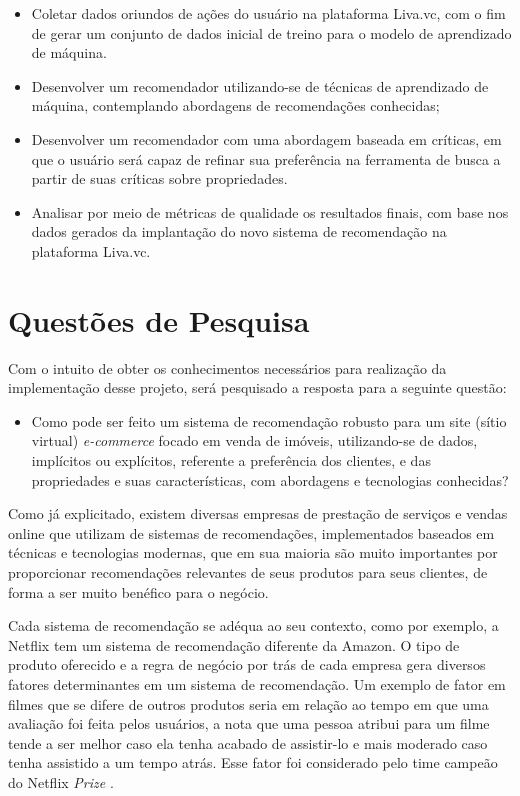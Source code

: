 \begin{itemize}
    \item Coletar dados oriundos de ações do usuário na plataforma Liva.vc, com o fim de gerar um conjunto de dados inicial de treino para o modelo de aprendizado de máquina.
    \item Desenvolver um recomendador utilizando-se de técnicas de aprendizado de máquina, contemplando abordagens de recomendações conhecidas;
    \item Desenvolver um recomendador com uma abordagem baseada em críticas, em que o usuário será capaz de refinar sua preferência na ferramenta de busca a partir de suas críticas sobre propriedades.
    \item Analisar por meio de métricas de qualidade os resultados finais, com base nos dados gerados da implantação do novo sistema de recomendação na plataforma Liva.vc.
\end{itemize}

\section{Questões de Pesquisa}

Com o intuito de obter os conhecimentos necessários para realização da implementação desse projeto, será pesquisado a resposta para a seguinte questão:
\begin{itemize}
    \item Como pode ser feito um sistema de recomendação robusto para um site (sítio virtual) \textit{e-commerce} focado em venda de imóveis, utilizando-se de dados, implícitos ou explícitos, referente a preferência dos clientes, e das propriedades e suas características, com abordagens e tecnologias conhecidas?
\end{itemize}

Como já explicitado, existem diversas empresas de prestação de serviços e vendas online que utilizam de sistemas de recomendações, implementados baseados em técnicas e tecnologias modernas, que em sua maioria são muito importantes por proporcionar recomendações relevantes de seus produtos para seus clientes, de forma a ser muito benéfico para o negócio. 

Cada sistema de recomendação se adéqua ao seu contexto, como por exemplo, a Netflix tem um sistema de recomendação diferente da Amazon. O tipo de produto oferecido e a regra de negócio por trás de cada empresa gera diversos fatores determinantes em um sistema de recomendação. Um exemplo de fator em filmes que se difere de outros produtos seria em relação ao tempo em que uma avaliação foi feita pelos usuários, a nota que uma pessoa atribui para um filme tende a ser melhor caso ela tenha acabado de assistir-lo e mais moderado caso tenha assistido a um tempo atrás. Esse fator foi considerado pelo time campeão do Netflix \textit{Prize} \cite{GARCIA:2015}.
 
